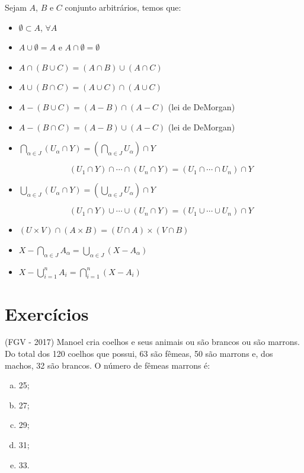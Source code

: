 \begin{prop}
Sejam $A$, $B$ e $C$ conjunto arbitrários, temos que:
\begin{itemize}
 \item $\emptyset \subset A$, $\forall A$
 \item $A \cup \emptyset= A$ e $A \cap \emptyset= \emptyset$
 \item $A \cap (B \cup C) = (A \cap B) \cup (A \cap C)$
 \item $A \cup (B \cap C) = (A \cup C) \cap (A \cup C)$
 \item $A - (B \cup C) = (A - B) \cap (A - C)$ (lei de DeMorgan)
 \item $A - (B \cap C) = (A - B) \cup (A - C)$ (lei de DeMorgan)
 \item $\bigcap_{\alpha \in J}(U_{\alpha} \cap Y) = (\bigcap_{\alpha \in J} U_{\alpha}) \cap Y$

  $$(U_1 \cap Y) \cap \cdots \cap (U_n \cap Y) = (U_1 \cap \cdots \cap U_n) \cap Y$$

 \item $\bigcup_{\alpha \in J}(U_{\alpha} \cap Y) = (\bigcup_{\alpha \in J} U_{\alpha}) \cap Y$

 $$(U_1 \cap Y) \cup \cdots \cup (U_n \cap Y) = (U_1 \cup \cdots \cup U_n) \cap Y$$

 \item $(U \times V) \cap (A \times B) = (U \cap A) \times (V \cap B)$

 \item $X - \bigcap_{\alpha \in J} A_{\alpha} = \bigcup_{\alpha \in J}(X - A_{\alpha})$

 \item $X - \bigcup_{i= 1}^{n} A_i = \bigcap_{i = 1}^{n}(X - A_i)$

\end{itemize}
\end{prop}

\section{Exercícios}
\begin{exer}
  (FGV - 2017) Manoel cria coelhos e seus animais ou são brancos ou são marrons. Do total dos 120 coelhos que possui, 63 são fêmeas, 50 são marrons e, dos machos, 32 são brancos. O número de fêmeas marrons é:
  \begin{multicols}{5}
  \begin{enumerate}[a)]
  \item 25;
  \item 27;
  \item 29;
  \item 31;
  \item 33.
  \end{enumerate}
  \end{multicols}
\end{exer}

